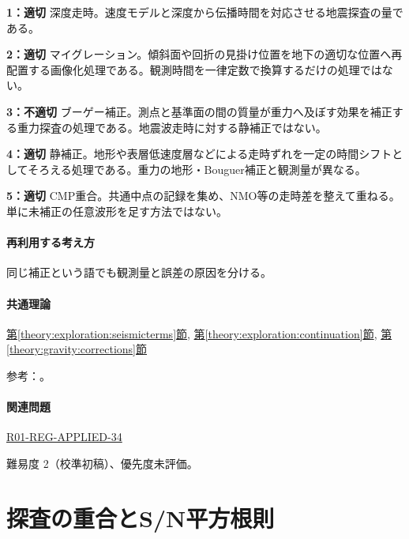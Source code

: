 \noindent\textbf{1：適切} 深度走時。速度モデルと深度から伝播時間を対応させる地震探査の量である。\par

\noindent\textbf{2：適切} マイグレーション。傾斜面や回折の見掛け位置を地下の適切な位置へ再配置する画像化処理である。観測時間を一律定数で換算するだけの処理ではない。\par

\noindent\textbf{3：不適切} ブーゲー補正。測点と基準面の間の質量が重力へ及ぼす効果を補正する重力探査の処理である。地震波走時に対する静補正ではない。\par

\noindent\textbf{4：適切} 静補正。地形や表層低速度層などによる走時ずれを一定の時間シフトとしてそろえる処理である。重力の地形・Bouguer補正と観測量が異なる。\par

\noindent\textbf{5：適切} CMP重合。共通中点の記録を集め、NMO等の走時差を整えて重ねる。単に未補正の任意波形を足す方法ではない。\par

\paragraph{再利用する考え方} 同じ補正という語でも観測量と誤差の原因を分ける。

\paragraph{共通理論} \hyperref[theory:exploration:seismicterms]{第\ref*{theory:exploration:seismicterms}節}, \hyperref[theory:exploration:continuation]{第\ref*{theory:exploration:continuation}節}, \hyperref[theory:gravity:corrections]{第\ref*{theory:gravity:corrections}節}

\par 参考：\cite{usgs_refraction2013,epa_seismic_reflection,usgs_static2004,usgs_processing2000,stanford_downward2001}。

\paragraph{関連問題} \hyperref[q:r01-reg-applied-34]{R01-REG-APPLIED-34}

\par 難易度 2（校準初稿）、優先度未評価。

\section{探査の重合とS/N平方根則}

